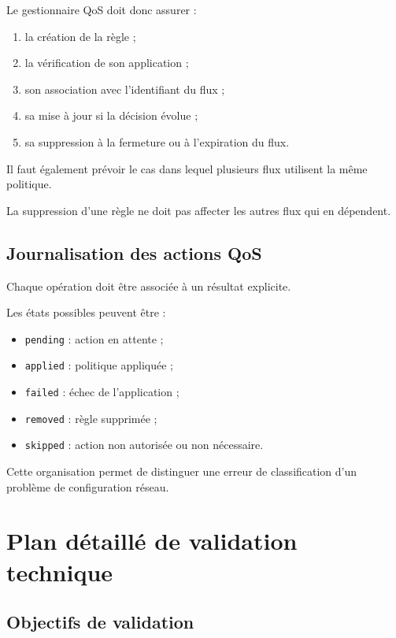 Le gestionnaire QoS doit donc assurer :

\begin{enumerate}
    \item la création de la règle ;
    \item la vérification de son application ;
    \item son association avec l'identifiant du flux ;
    \item sa mise à jour si la décision évolue ;
    \item sa suppression à la fermeture ou à l'expiration du flux.
\end{enumerate}

Il faut également prévoir le cas dans lequel plusieurs flux utilisent la même politique.

La suppression d'une règle ne doit pas affecter les autres flux qui en dépendent.

\subsection{Journalisation des actions QoS}

Chaque opération doit être associée à un résultat explicite.

Les états possibles peuvent être :

\begin{itemize}
    \item \texttt{pending} : action en attente ;
    \item \texttt{applied} : politique appliquée ;
    \item \texttt{failed} : échec de l'application ;
    \item \texttt{removed} : règle supprimée ;
    \item \texttt{skipped} : action non autorisée ou non nécessaire.
\end{itemize}

Cette organisation permet de distinguer une erreur de classification d'un problème de configuration réseau.

\section{Plan détaillé de validation technique}

\subsection{Objectifs de validation}

